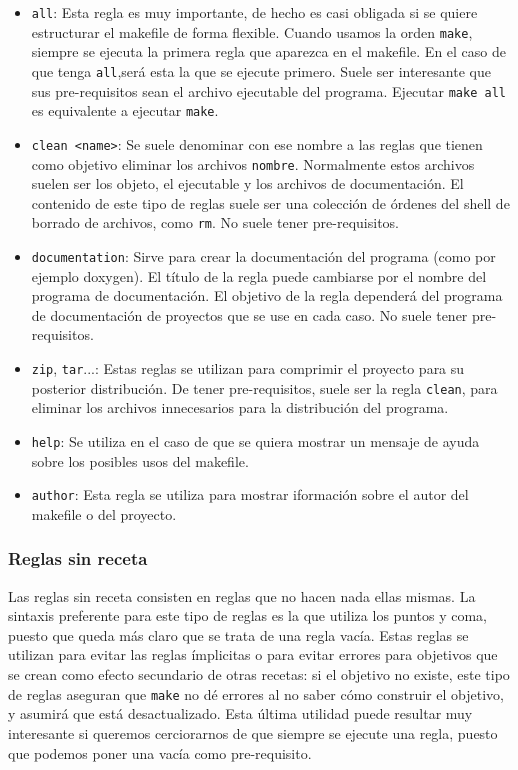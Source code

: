 \documentclass[11pt,twoside,titlepage,a4paper]{article}
\theoremstyle{definition}
\theoremstyle{plain_rojo}
\theoremstyle{remark}
\begin{document}
\begin{itemize}[font={\color{rojooscuro}\bfseries}]
	\item \textcolor{rojooscuro}{\texttt{all}:} Esta regla es muy importante, 
	de hecho es casi obligada si se quiere estructurar el makefile de forma 
	flexible. Cuando usamos la orden \texttt{make}, siempre se ejecuta la 
	primera regla que aparezca en el makefile. En el caso de que tenga 
	\texttt{all},será esta la que se ejecute primero. Suele ser interesante 
	que sus pre-requisitos sean el archivo ejecutable del programa. Ejecutar 
	\texttt{make all} es equivalente a ejecutar \texttt{make}.
	\item \textcolor{rojooscuro}{\texttt{clean <name>}:} Se suele denominar 
	con ese nombre a las reglas que tienen como objetivo eliminar los 
	archivos \texttt{nombre}. Normalmente estos archivos suelen ser los 
	objeto, el ejecutable y los archivos de documentación. El contenido de este tipo de reglas suele ser una colección de órdenes del shell de borrado de archivos, como \texttt{rm}. No suele tener pre-requisitos.
	\item \textcolor{rojooscuro}{\texttt{documentation}:} Sirve para crear la 
	documentación del programa (como por ejemplo doxygen). El título de la 
	regla puede cambiarse por el nombre del programa de documentación. El 
	objetivo de la regla dependerá del programa de documentación de proyectos
	que se use en cada caso. No suele tener pre-requisitos.
	\item \textcolor{rojooscuro}{\texttt{zip}, \texttt{tar}...:} Estas reglas 
	se utilizan para comprimir el proyecto para su posterior distribución. De 
	tener pre-requisitos, suele ser la regla \texttt{clean}, para eliminar 
	los archivos innecesarios para la distribución del programa.
	\item \textcolor{rojooscuro}{\texttt{help}:} Se utiliza en el caso de que 
	se quiera mostrar un mensaje de ayuda sobre los posibles usos del
	makefile.
	\item \textcolor{rojooscuro}{\texttt{author}:} Esta regla se utiliza para
	mostrar iformación sobre el autor del makefile o del proyecto.
\end{itemize}

\subsubsection{Reglas sin receta}

Las reglas sin receta consisten en reglas que no hacen nada ellas mismas. La 
sintaxis preferente para este tipo de reglas es la que utiliza los puntos y
coma, puesto que queda más claro que se trata de una regla vacía. Estas 
reglas se utilizan para evitar las reglas ímplicitas o para evitar errores 
para objetivos que se crean como efecto secundario de otras recetas: si el 
objetivo no existe, este tipo de reglas aseguran que \texttt{make} no dé
errores al no saber cómo construir el objetivo, y asumirá que está
desactualizado. Esta última utilidad puede resultar muy interesante si 
queremos cerciorarnos de que siempre se ejecute una regla, puesto que podemos
poner una vacía como pre-requisito.
\end{document}
